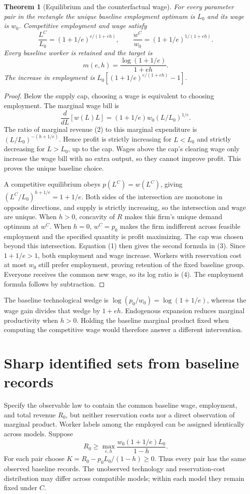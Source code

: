 \documentclass[11pt]{article}
\newtheorem{theorem}{Theorem}
\theoremstyle{remark}
\begin{document}
\begin{theorem}[Equilibrium and the counterfactual wage]
For every parameter pair in the rectangle the unique baseline employment
optimum is $L_0$ and its wage is $w_0$. Competitive employment and wage
satisfy
\[
 \frac{L^C}{L_0}=(1+1/e)^{e/(1+eh)},\qquad
 \frac{w^C}{w_0}=(1+1/e)^{1/(1+eh)}. \tag{3}
\]
Every baseline worker is retained and the target is
\[
 m(e,h)=\frac{\log(1+1/e)}{1+eh}. \tag{4}
\]
The increase in employment is $L_0[(1+1/e)^{e/(1+eh)}-1]$.
\end{theorem}
\begin{proof}
Below the supply cap, choosing a wage is equivalent to choosing employment.
The marginal wage bill is
\[
 \frac{d}{dL}[w(L)L]=(1+1/e)w_0(L/L_0)^{1/e}.
\]
The ratio of marginal revenue (2) to this marginal expenditure is
$(L/L_0)^{-(h+1/e)}$. Hence profit is strictly increasing for $L<L_0$
and strictly decreasing for $L>L_0$, up to the cap. Wages above the
cap's clearing wage only increase the wage bill with no extra output,
so they cannot improve profit. This proves the unique baseline choice.

A competitive equilibrium obeys $p(L^C)=w(L^C)$, giving
$(L^C/L_0)^{h+1/e}=1+1/e$. Both sides of the intersection are monotone
in opposite directions, and supply is strictly increasing, so the
intersection and wage are unique. When $h>0$, concavity of $R$ makes
this firm's unique demand optimum at $w^C$. When $h=0$, $w^C=p_0$ makes
the firm indifferent across feasible employment and the specified quantity
is profit maximizing. The cap was chosen beyond this intersection.
Equation (1) then gives the second formula in (3).
Since $1+1/e>1$, both employment and wage increase. Workers with reservation
cost at most $w_0$ still prefer employment, proving retention of the fixed
baseline group. Everyone receives the common new wage, so its log ratio
is (4). The employment formula follows by subtraction.
\end{proof}

The baseline technological wedge is
$\log(p_0/w_0)=\log(1+1/e)$, whereas the wage gain divides that wedge
by $1+eh$. Endogenous expansion reduces marginal productivity when $h>0$.
Holding the baseline marginal product fixed when computing the competitive
wage would therefore answer a different intervention.

\section{Sharp identified sets from baseline records}
Specify the observable law to contain the common baseline wage, employment,
and total revenue $R_0$, but neither reservation costs nor a direct
observation of marginal product. Worker labels among the employed can be
assigned identically across models. Suppose
\[
 R_0\geq\max_{e,h}\frac{w_0(1+1/e)L_0}{1-h}.
\]
For each pair choose $K=R_0-p_0L_0/(1-h)\geq0$. Thus every pair has
the same observed baseline records. The unobserved technology and
reservation-cost distribution may differ across compatible models;
within each model they remain fixed under $C$.
\end{document}
